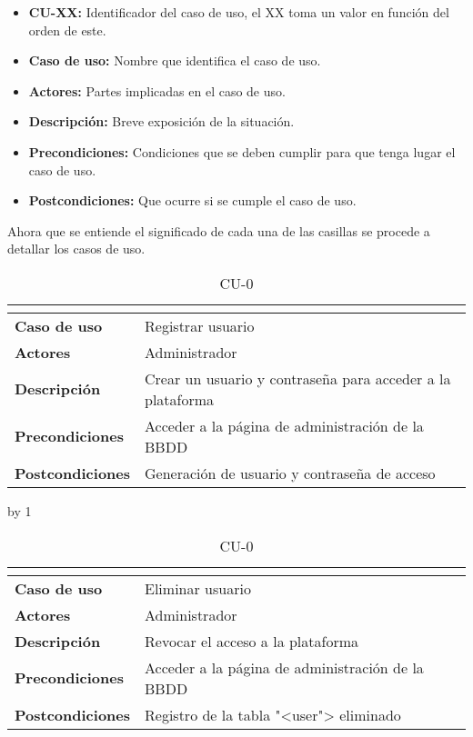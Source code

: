 \begin{itemize}
	\item \textbf{CU-XX:} Identificador del caso de uso, el XX toma un valor en función del orden de este.
	\item \textbf{Caso de uso:} Nombre que identifica el caso de uso.
	\item \textbf{Actores:} Partes implicadas en el caso de uso.
	\item \textbf{Descripción:} Breve exposición de la situación.
	\item \textbf{Precondiciones:} Condiciones que se deben cumplir para que tenga lugar el caso de uso.
	\item \textbf{Postcondiciones:} Que ocurre si se cumple el caso de uso.
\end{itemize}

Ahora que se entiende el significado de cada una de las casillas se procede a detallar los casos de uso.
\newcount\cu
{}
\begin{table}[H]
	\centering
	\caption{CU-0\number\cu}
	\begin{tabular}{|l|p{}|}
		\hline
		\multicolumn{2}{|c|}{\cellcolor[HTML]{BFBFBF}{\color[HTML]{000000} \textbf{CU-0\number\cu}}} \\ \hline
		\textbf{Caso de uso}     & Registrar usuario                                          \\ \hline
		\textbf{Actores}         & Administrador                                              \\ \hline
		\textbf{Descripción}     & Crear un usuario y contraseña para acceder a la plataforma \\ \hline
		\textbf{Precondiciones}  & Acceder a la página de administración de la BBDD           \\ \hline
		\textbf{Postcondiciones} & Generación de usuario y contraseña de acceso               \\ \hline
	\end{tabular}
\end{table}
\advance\cu by 1
\begin{table}[H]
	\centering
	\caption{CU-0\number\cu}
	\begin{tabular}{|l|p{}|}
		\hline
		\multicolumn{2}{|c|}{\cellcolor[HTML]{BFBFBF}{\color[HTML]{000000} \textbf{CU-0\number\cu}}} \\ \hline
		\textbf{Caso de uso}     & Eliminar usuario                                 \\ \hline
		\textbf{Actores}         & Administrador                                    \\ \hline
		\textbf{Descripción}     & Revocar el acceso a la plataforma                \\ \hline
		\textbf{Precondiciones}  & Acceder a la página de administración de la BBDD \\ \hline
		\textbf{Postcondiciones} & Registro de la tabla "<user"> eliminado            \\ \hline
	\end{tabular}
\end{table}

